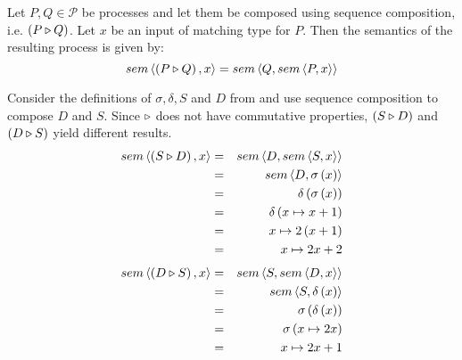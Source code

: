 \begin{definition}
\label{def:sem_sequence}
Let $P, Q \in \mathcal{P}$ be processes and let them be composed using sequence composition, i.e. $\left( P \triangleright Q \right)$. Let $x$ be an input of matching type for $P$. Then the semantics of the resulting process is given by:
  \begin{equation}
    \label{eqn:sem_sequence}
    sem \left\langle \left( P \triangleright Q \right), x \right\rangle = sem \left\langle Q, sem \left\langle P, x \right\rangle \right\rangle
  \end{equation}
  \hfill\qedsymbol
\end{definition}

\begin{example}
\label{exp:sem_sequence}
Consider the definitions of $\sigma, \delta, S$ and $D$ from  and use sequence composition to compose $D$ and $S$. Since $\triangleright$ does not have commutative properties, $\left( S \triangleright D \right)$ and $\left( D \triangleright S \right)$ yield different results.
  \begin{eqnarray*}
    sem \left\langle \left( S \triangleright D \right), x \right\rangle & = & sem \left\langle D, sem \left\langle S, x \right\rangle \right\rangle \\
                             & = & sem \left\langle D, \sigma \left( x \right) \right\rangle \\
                             & = & \delta \left( \sigma \left( x \right) \right) \\
                             & = & \delta \left( x \mapsto x+1 \right) \\
                             & = & x \mapsto 2 \left( x+1 \right) \\
                             & = & x \mapsto 2x+2
  \end{eqnarray*}
  \begin{eqnarray*}
    sem \left\langle \left( D \triangleright S \right), x \right\rangle & = & sem \left\langle S, sem \left\langle D, x \right\rangle \right\rangle \\
                             & = & sem \left\langle S, \delta \left( x \right) \right\rangle \\
                             & = & \sigma \left( \delta \left( x \right) \right) \\
                             & = & \sigma \left( x \mapsto 2x \right) \\
                             & = & x \mapsto 2x + 1
  \end{eqnarray*}
  \hfill\qedsymbol
\end{example}



